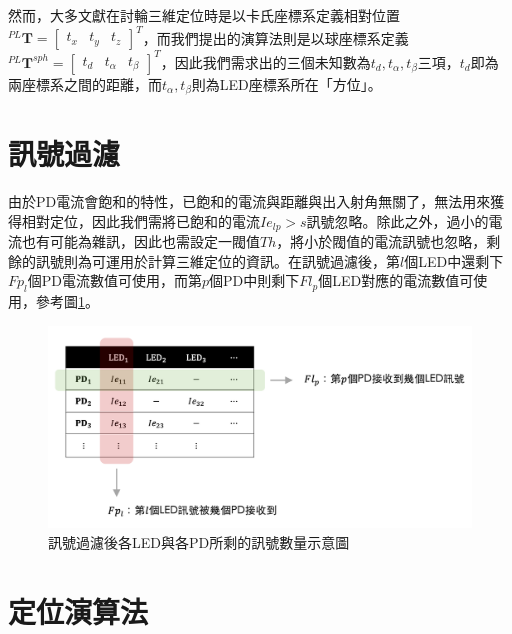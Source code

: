     然而，大多文獻在討輪三維定位時是以卡氏座標系定義相對位置$^{PL}\boldsymbol{T}=\left[\begin{array}{ccc}t_x&t_y&t_z\end{array}\right]^T$，而我們提出的演算法則是以球座標系定義$^{PL}\boldsymbol{T}^{sph}=\left[\begin{array}{ccc}t_d&t_{\alpha}&t_{\beta}\end{array}\right]^T$，因此我們需求出的三個未知數為$t_d,t_\alpha,t_\beta$三項，$t_d$即為兩座標系之間的距離，而$t_{\alpha},t_{\beta}$則為LED座標系所在「方位」。


\section{訊號過濾}
\label{chp:algorithm_filter}

由於PD電流會飽和的特性，已飽和的電流與距離與出入射角無關了，無法用來獲得相對定位，因此我們需將已飽和的電流$Ie_{lp}>s$訊號忽略。除此之外，過小的電流也有可能為雜訊，因此也需設定一閥值$Th$，將小於閥值的電流訊號也忽略，剩餘的訊號則為可運用於計算三維定位的資訊。在訊號過濾後，第$l$個LED中還剩下$Fp_l$個PD電流數值可使用，而第$p$個PD中則剩下$Fl_p$個LED對應的電流數值可使用，參考圖\ref{pic:after_filter}。

\begin{figure}[h!]
    \centering
    \includegraphics[width=15cm]{ch3pic/after_filter.png}
    \caption{訊號過濾後各LED與各PD所剩的訊號數量示意圖}
    \label{pic:after_filter}
\end{figure}

\section{定位演算法}
\label{chp:algorithm}

